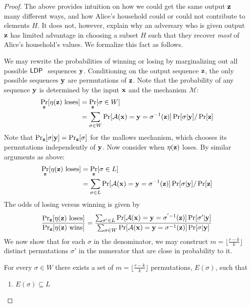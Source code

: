 \begin{proof}
 The above provides intuition on how we could get the same output $\mathbf{z}$ many different ways, and how Alice's household could or could not contribute to elements $H$. It does not, however, explain why an adversary who is given output $\mathbf{z}$ has limited advantage in choosing a subset $H$ such that they recover \emph{most} of Alice's household's values. We formalize this fact as follows. 
 
 We may rewrite the probabilities of winning or losing by marginalizing out all possible $\textsf{LDP}~$ sequences $\mathbf{y}$. Conditioning on the output sequence $\mathbf{z}$, the only possible \ldp sequences $\mathbf{y}$ are permutations of $\mathbf{z}$. Note that the probability of any sequence $\mathbf{y}$ is determined by the input $\mathbf{x}$ and the \ldp mechanism $\mathcal{M}$:  
 \begin{align*}
    \Pr_{\mathbf{z}}[\eta(\mathbf{z}) \text{ loses}]
     &= \Pr_{\mathbf{z}} [\sigma \in W] \\
     &= \sum_{\sigma \in W}
     \Pr [\mathcal{A}(\mathbf{x}) = \mathbf{y} = \sigma^{-1}(\mathbf{z})]  \Pr [ \sigma | \mathbf{y} ] / \Pr[\mathbf{z}] 
 \end{align*}
 Note that $\Pr_{\mathbf{z}} [\sigma | \mathbf{y}] = \Pr_{\mathbf{z}} [\sigma]$ for the mallows mechanism, which chooses its permutations independently of $\mathbf{y}$. Now consider when $\eta(\mathbf{z})$ loses. By similar arguments as above: 
\begin{align*}
    \Pr_{\mathbf{z}}[\eta(\mathbf{z}) \text{ loses}]
    &= \Pr_{\mathbf{z}}[\sigma \in L] \\
    &= \sum_{\sigma \in L}
     \Pr [\mathcal{A}(\mathbf{x}) = \mathbf{y} = \sigma^{-1}(\mathbf{z})]  \Pr [ \sigma | \mathbf{y} ] / \Pr[\mathbf{z}]
\end{align*}
The odds of losing versus winning is given by 
 \begin{align*}
    \frac{\Pr_{\mathbf{z}}[\eta(\mathbf{z}) \text{ loses}]}{\Pr_{\mathbf{z}}[\eta(\mathbf{z}) \text{ wins}]}
    &= \frac{ \sum_{\sigma' \in L} \Pr [\mathcal{A}(\mathbf{x}) = \mathbf{y} = \sigma^{'-1}(\mathbf{z})]  \Pr [ \sigma' | \mathbf{y} ] }
    { \sum_{\sigma \in W} \Pr [\mathcal{A}(\mathbf{x}) = \mathbf{y} = \sigma^{-1}(\mathbf{z})]  \Pr [ \sigma | \mathbf{y} ] } \\
\end{align*}
We now show that for each $\sigma$ in the denominator, we may construct $m = \lfloor \frac{r-k}{k} \rfloor$ distinct permutations $\sigma'$ in the numerator that are close in probability to it. 
\begin{lemma}
For every $\sigma \in W$ there exists a set of $m = \lfloor \frac{r-k}{k} \rfloor$ permutations, $E(\sigma)$, such that 
\begin{enumerate}
    \item $E(\sigma) \subseteq L$

\end{enumerate}
\end{lemma}
\end{proof}
